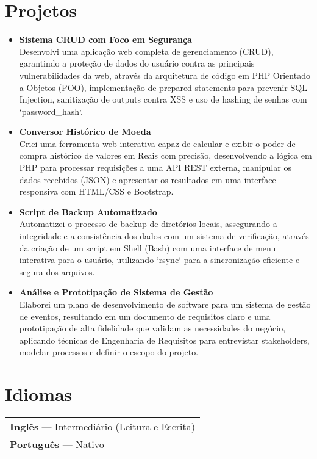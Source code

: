 \documentclass[a4paper,12pt]{article}
\begin{document}
\section*{Projetos}
\begin{itemize}[noitemsep, nolistsep, leftmargin=*, itemsep=8pt]
    \item 
        \textbf{Sistema CRUD com Foco em Segurança} \\
        Desenvolvi uma aplicação web completa de gerenciamento (CRUD), garantindo a proteção de dados do usuário contra as principais vulnerabilidades da web, através da arquitetura de código em PHP Orientado a Objetos (POO), implementação de prepared statements para prevenir SQL Injection, sanitização de outputs contra XSS e uso de hashing de senhas com `password_hash`.

    \item 
        \textbf{Conversor Histórico de Moeda} \\
        Criei uma ferramenta web interativa capaz de calcular e exibir o poder de compra histórico de valores em Reais com precisão, desenvolvendo a lógica em PHP para processar requisições a uma API REST externa, manipular os dados recebidos (JSON) e apresentar os resultados em uma interface responsiva com HTML/CSS e Bootstrap.

    \item 
        \textbf{Script de Backup Automatizado} \\
        Automatizei o processo de backup de diretórios locais, assegurando a integridade e a consistência dos dados com um sistema de verificação, através da criação de um script em Shell (Bash) com uma interface de menu interativa para o usuário, utilizando `rsync` para a sincronização eficiente e segura dos arquivos.
        
    \item 
        \textbf{Análise e Prototipação de Sistema de Gestão} \\
        Elaborei um plano de desenvolvimento de software para um sistema de gestão de eventos, resultando em um documento de requisitos claro e uma prototipação de alta fidelidade que validam as necessidades do negócio, aplicando técnicas de Engenharia de Requisitos para entrevistar stakeholders, modelar processos e definir o escopo do projeto.
\end{itemize}

\section{Idiomas}
\begin{tabularx}{\linewidth}{@{}X@{}}
\textbf{Inglês} — Intermediário (Leitura e Escrita) \\
\textbf{Português} — Nativo \\
\end{tabularx}

\vfill
{}
\end{document}

